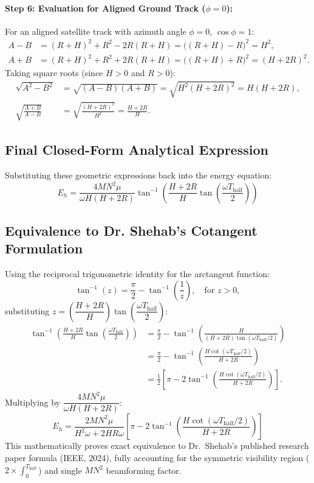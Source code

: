 \documentclass[11pt,a4paper]{article}
\begin{document}
\paragraph{Step 6: Evaluation for Aligned Ground Track ($\phi = 0$):}
For an aligned satellite track with azimuth angle $\phi = 0$, $\cos\phi = 1$:
\begin{align}
    A - B &= (R + H)^2 + R^2 - 2R(R + H) = \big((R + H) - R\big)^2 = H^2, \\
    A + B &= (R + H)^2 + R^2 + 2R(R + H) = \big((R + H) + R\big)^2 = (H + 2R)^2.
\end{align}
Taking square roots (since $H > 0$ and $R > 0$):
\begin{align}
    \sqrt{A^2 - B^2} &= \sqrt{(A - B)(A + B)} = \sqrt{H^2 (H + 2R)^2} = H(H + 2R), \\
    \sqrt{\frac{A + B}{A - B}} &= \sqrt{\frac{(H + 2R)^2}{H^2}} = \frac{H + 2R}{H}.
\end{align}

\subsection{Final Closed-Form Analytical Expression}
Substituting these geometric expressions back into the energy equation:
\begin{equation}
    \boxed{E_h = \frac{4 M N^2 \mu}{\omega H (H + 2R)} \tan^{-1}\left( \frac{H + 2R}{H} \tan\left( \frac{\omega T_{\text{half}}}{2} \right) \right)}
\end{equation}

\subsection{Equivalence to Dr. Shehab's Cotangent Formulation}
Using the reciprocal trigonometric identity for the arctangent function:
\begin{equation}
    \tan^{-1}(z) = \frac{\pi}{2} - \tan^{-1}\left( \frac{1}{z} \right), \quad \text{for } z > 0,
\end{equation}
substituting $z = \left( \dfrac{H + 2R}{H} \right) \tan\left(\dfrac{\omega T_{\text{half}}}{2}\right)$:
\begin{align*}
    \tan^{-1}\left( \frac{H + 2R}{H} \tan\left(\frac{\omega T_{\text{half}}}{2}\right) \right) 
    &= \frac{\pi}{2} - \tan^{-1}\left( \frac{H}{(H + 2R) \tan(\omega T_{\text{half}} / 2)} \right) \\
    &= \frac{\pi}{2} - \tan^{-1}\left( \frac{H \cot(\omega T_{\text{half}} / 2)}{H + 2R} \right) \\
    &= \frac{1}{2} \left[ \pi - 2 \tan^{-1}\left( \frac{H \cot(\omega T_{\text{half}} / 2)}{H + 2R} \right) \right].
\end{align*}
Multiplying by $\dfrac{4 M N^2 \mu}{\omega H (H + 2R)}$:
\begin{equation}
    \boxed{E_h = \frac{2 M N^2 \mu}{H^2 \omega + 2HR\omega} \left[ \pi - 2 \tan^{-1}\left( \frac{H \cot(\omega T_{\text{half}} / 2)}{H + 2R} \right) \right]}
\end{equation}
This mathematically proves exact equivalence to Dr.~Shehab's published research paper formula (IEEE, 2024), fully accounting for the symmetric visibility region ($2 \times \int_0^{T_{\text{half}}}$) and single $M N^2$ beamforming factor.
\end{document}
